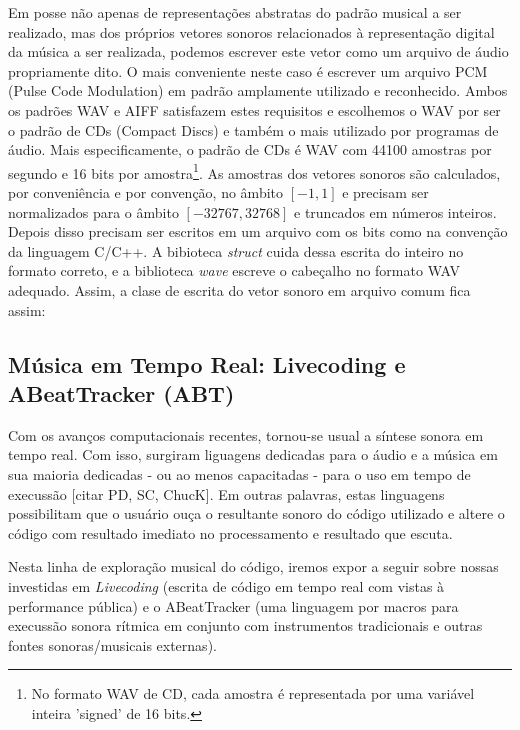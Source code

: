 
Em posse não apenas de representações abstratas do padrão musical a ser realizado, mas dos próprios vetores sonoros relacionados à representação digital da música a ser realizada, podemos escrever este vetor como um arquivo de áudio propriamente dito. O mais conveniente neste caso é escrever um arquivo PCM (Pulse Code Modulation) em padrão amplamente utilizado e reconhecido. Ambos os padrões WAV e AIFF satisfazem estes requisitos e escolhemos o WAV por ser o padrão de CDs (Compact Discs) e também o mais utilizado por programas de áudio. Mais especificamente, o padrão de CDs é WAV com 44100 amostras por segundo e 16 bits por amostra\footnote{No formato WAV de CD, cada amostra é representada por uma variável inteira 'signed' de 16 bits.}. As amostras dos vetores sonoros são calculados, por conveniência e por convenção, no âmbito $[-1,1]$ e precisam ser normalizados para o âmbito $[-32767,32768]$ e truncados em números inteiros. Depois disso precisam ser escritos em um arquivo com os bits como na convenção da linguagem C/C++. A bibioteca \emph{struct} cuida dessa escrita do inteiro no formato correto, e a biblioteca \emph{wave} escreve o cabeçalho no formato WAV adequado. Assim, a clase de escrita do vetor sonoro em arquivo comum fica assim:



  \subsection{Música em Tempo Real: Livecoding e ABeatTracker (ABT)}

Com os avanços computacionais recentes, tornou-se usual a síntese sonora
em tempo real. Com isso, surgiram liguagens dedicadas para o áudio e a música
em sua maioria dedicadas - ou ao menos capacitadas - para o uso 
em tempo de execussão [citar PD, SC, ChucK]. Em outras palavras, estas linguagens
possibilitam que o usuário ouça o resultante sonoro do código utilizado e altere
o código com resultado imediato no processamento e resultado que escuta.

Nesta linha de exploração musical do código, iremos expor a seguir sobre
nossas investidas em \emph{Livecoding} (escrita de código em tempo real
com vistas à performance pública) e o ABeatTracker (uma linguagem por macros
para execussão sonora rítmica em conjunto com instrumentos tradicionais e outras
fontes sonoras/musicais externas).


